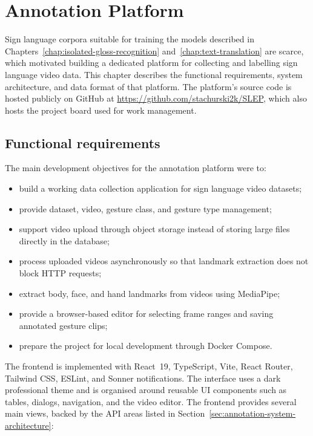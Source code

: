 
\section{Annotation Platform}
\label{chap:annotation-platform}

Sign language corpora suitable for training the models described in
Chapters~\ref{chap:isolated-gloss-recognition} and~\ref{chap:text-translation}
are scarce, which motivated building a dedicated platform for collecting and
labelling sign language video data. This chapter describes the functional
requirements, system architecture, and data format of that platform. The
platform's source code is hosted publicly on GitHub at
\url{https://github.com/stachurski2k/SLEP}, which also hosts the project board
used for work management.

\subsection{Functional requirements}
\label{sec:annotation-functional-requirements}

The main development objectives for the annotation platform were to:

\begin{itemize}
  \item build a working data collection application for sign language video
        datasets;
  \item provide dataset, video, gesture class, and gesture type management;
  \item support video upload through object storage instead of storing large
        files directly in the database;
  \item process uploaded videos asynchronously so that landmark extraction does
        not block HTTP requests;
  \item extract body, face, and hand landmarks from videos using MediaPipe;
  \item provide a browser-based editor for selecting frame ranges and saving
        annotated gesture clips;
  \item prepare the project for local development through Docker Compose.
\end{itemize}

The frontend is implemented with React~19, TypeScript, Vite, React Router,
Tailwind CSS, ESLint, and Sonner notifications. The interface uses a dark
professional theme and is organised around reusable UI components such as
tables, dialogs, navigation, and the video editor. The frontend provides several
main views, backed by the API areas listed in
Section~\ref{sec:annotation-system-architecture}:

